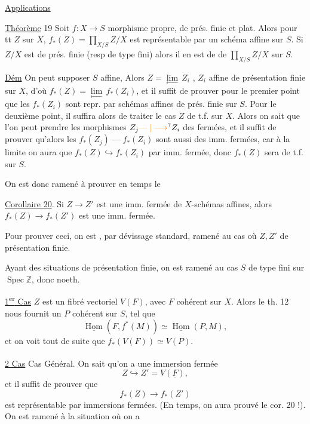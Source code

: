 \begin{center}\uline{Applications}\end{center}

\uline{Théorème} 19 Soit $f:X\longrightarrow S$ morphisme propre, de prés. finie et plat. Alors pour tt $Z$  sur $X$, $f_*(Z)=\displaystyle\prod_{X/S} Z/X$ est représentable par un schéma affine sur $S$. Si $Z/X$ est de prés. finie (resp de type fini) alors il en est de  de $\displaystyle\prod_{X/S}Z/X$ sur $S$.

\uline{Dém} On peut supposer $S$ affine,    Alors $Z=\underset{\longleftarrow}{\lim}\,Z_i$ , $Z_i$ affine de présentation finie sur $X$, d'où $f_*(Z)=\underset{\longleftarrow}{\lim}\,f_*(Z_i)$, et il suffit de prouver pour le premier point que les $f_*(Z_i)$ sont repr. par schémas affines de prés. finie sur $S$. Pour le deuxième point, il suffira alors de traiter le cas $Z$ de t.f. sur $X$.
Alors on sait que l'on peut prendre les morphismes  $Z_j\unsure{\mathrel{\text{---}}|\longrightarrow} Z_i$ des  fermées, et il suffit de prouver qu'alors les $f_*(Z_j)\mathrel{\text{---}} f_*(Z_i)$ sont aussi des imm. fermées, car à la limite on aura que $f_*(Z)\hookrightarrow f_*(Z_i)$ par imm. fermée, donc $f_*(Z)$ sera de t.f. sur $S$.

On est donc ramené à prouver en  temps le

\uline{Corollaire 20}. Si $Z\longrightarrow Z'$ est une imm. fermée de $X$-schémas affines, alors $f_*(Z)\longrightarrow f_*(Z')$ est une imm. fermée.

Pour prouver ceci, on est , par dévissage standard, ramené au cas où $Z,Z'$ de présentation finie.

Ayant des situations de présentation finie, on est ramené au cas $S$ de type fini sur $\operatorname{Spec}\mathbb Z$, donc noeth.

\uline{1\textsuperscript{er} Cas} $Z$ est un fibré vectoriel $V(F)$, avec $F$ cohérent sur $X$. Alors le th. 12 nous fournit un $P$ cohérent sur $S$, tel que
\[
 \underline{\operatorname{Hom}}(F,f^*(M))\simeq\underline{\operatorname{Hom}}(P,M),
\]
et on voit tout de suite que $f_*(V(F))\simeq V(P)$.

\uline{2\textsuperscript{} Cas} Cas Général. On sait qu'on a
une immersion fermée
\[
 Z\hookrightarrow Z'=V(\underline F),
\]
et il suffit de prouver que
\[
 f_*(Z)\longrightarrow f_*(Z')
\]
est représentable par immersions fermées. (En  temps, on aura prouvé le cor. 20 !). On est ramené à la situation où on a

